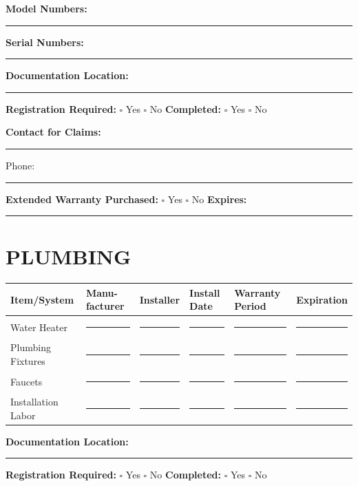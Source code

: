 \documentclass[11pt,letterpaper]{article}
\begin{document}
\vspace{6pt}

\textbf{Model Numbers:} \rule{10cm}{0.4pt}

\textbf{Serial Numbers:} \rule{9.5cm}{0.4pt}

\textbf{Documentation Location:} \rule{8cm}{0.4pt}

\textbf{Registration Required:} $\square$ Yes $\square$ No \hspace{0.3in} \textbf{Completed:} $\square$ Yes $\square$ No

\textbf{Contact for Claims:} \rule{7cm}{0.4pt} Phone: \rule{3cm}{0.4pt}

\textbf{Extended Warranty Purchased:} $\square$ Yes $\square$ No \hspace{0.2in} \textbf{Expires:} \rule{3cm}{0.4pt}

\vspace{12pt}

\section*{PLUMBING}

\begin{tabular}{|p{1.5in}|p{1in}|p{1in}|p{0.8in}|p{0.8in}|p{1in}|}
\hline
\textbf{Item/System} & \textbf{Manu-facturer} & \textbf{Installer} & \textbf{Install Date} & \textbf{Warranty Period} & \textbf{Expiration} \\
\hline
Water Heater & \rule{0.8in}{0.4pt} & \rule{0.8in}{0.4pt} & \rule{0.6in}{0.4pt} & \rule{0.6in}{0.4pt} & \rule{0.8in}{0.4pt} \\
\hline
Plumbing Fixtures & \rule{0.8in}{0.4pt} & \rule{0.8in}{0.4pt} & \rule{0.6in}{0.4pt} & \rule{0.6in}{0.4pt} & \rule{0.8in}{0.4pt} \\
\hline
Faucets & \rule{0.8in}{0.4pt} & \rule{0.8in}{0.4pt} & \rule{0.6in}{0.4pt} & \rule{0.6in}{0.4pt} & \rule{0.8in}{0.4pt} \\
\hline
Installation Labor & \rule{0.8in}{0.4pt} & \rule{0.8in}{0.4pt} & \rule{0.6in}{0.4pt} & \rule{0.6in}{0.4pt} & \rule{0.8in}{0.4pt} \\
\hline
\end{tabular}

\vspace{6pt}

\textbf{Documentation Location:} \rule{8cm}{0.4pt}

\textbf{Registration Required:} $\square$ Yes $\square$ No \hspace{0.3in} \textbf{Completed:} $\square$ Yes $\square$ No
\end{document}
